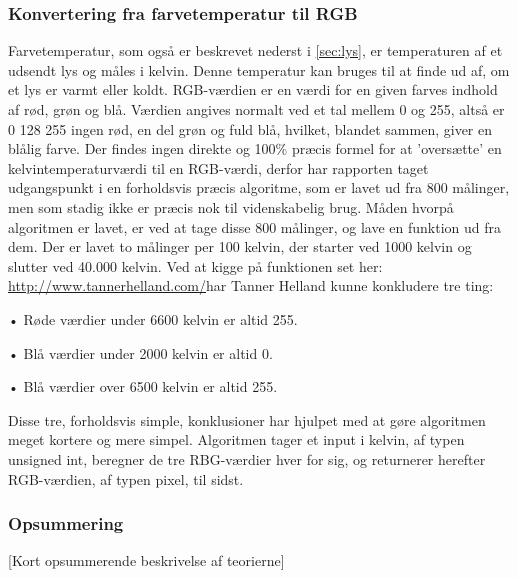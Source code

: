 \subsubsection{Konvertering fra farvetemperatur til RGB}
Farvetemperatur, som også er beskrevet nederst i \ref{sec:lys}, er temperaturen af et udsendt lys og måles i kelvin. Denne temperatur kan bruges til at finde ud af, om et lys er varmt eller koldt. 
RGB-værdien er en værdi for en given farves indhold af rød, grøn og blå. Værdien angives normalt ved et tal mellem 0 og 255, altså er 0 128 255 ingen rød, en del grøn og fuld blå, hvilket, blandet sammen, giver en blålig farve.
Der findes ingen direkte og 100\% præcis formel for at ’oversætte’ en kelvintemperaturværdi til en RGB-værdi, derfor har rapporten taget udgangspunkt i en forholdsvis præcis algoritme, som er lavet ud fra 800 målinger, men som stadig ikke er præcis nok til videnskabelig brug.
Måden hvorpå algoritmen er lavet, er ved at tage disse 800 målinger, og lave en funktion ud fra dem. Der er lavet to målinger per 100 kelvin, der starter ved 1000 kelvin og slutter ved 40.000 kelvin. Ved at kigge på funktionen set her: \href{http://www.tannerhelland.com/4435/convert-temperature-rgb-algorithm-code/raw_temperature_vs_rgb_chart/}{http://www.tannerhelland.com/}har Tanner Helland  kunne konkludere  tre ting:


•	Røde værdier under 6600 kelvin er altid 255.


•	Blå værdier under 2000 kelvin er altid 0.


•	Blå værdier over 6500 kelvin er altid 255.


Disse tre, forholdsvis simple, konklusioner har hjulpet med at gøre algoritmen meget kortere og mere simpel. Algoritmen tager et input i kelvin, af typen unsigned int, beregner de tre RBG-værdier hver for sig, og returnerer herefter RGB-værdien, af typen pixel, til sidst. 


\subsubsection*{Opsummering}

[Kort opsummerende beskrivelse af teorierne]